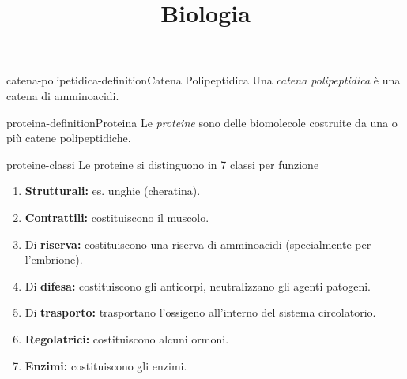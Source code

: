 \documentclass[preview]{standalone}
\begin{document}
\title{Biologia}
\genpage




\begin{snippetdefinition}{catena-polipetidica-definition}{Catena Polipeptidica}
    Una \textit{catena polipeptidica} è una catena di amminoacidi.
\end{snippetdefinition}

\begin{snippetdefinition}{proteina-definition}{Proteina}
    Le \textit{proteine} sono delle biomolecole costruite
    da una o più catene polipeptidiche.
\end{snippetdefinition}

\begin{snippet}{proteine-classi}
    Le proteine si distinguono in 7 classi per funzione
    \begin{enumerate}
        \item \textbf{Strutturali:} es. unghie (cheratina).

        \item \textbf{Contrattili:} costituiscono il muscolo.

        \item Di \textbf{riserva:} costituiscono una riserva di amminoacidi (specialmente per l'embrione).

        \item Di \textbf{difesa:} costituiscono gli anticorpi, neutralizzano gli agenti patogeni.
        
        \item Di \textbf{trasporto:} trasportano l'ossigeno all'interno del sistema circolatorio.

        \item \textbf{Regolatrici:} costituiscono alcuni ormoni.

        \item \textbf{Enzimi:} costituiscono gli enzimi.
    \end{enumerate}
\end{snippet}
\end{document}
